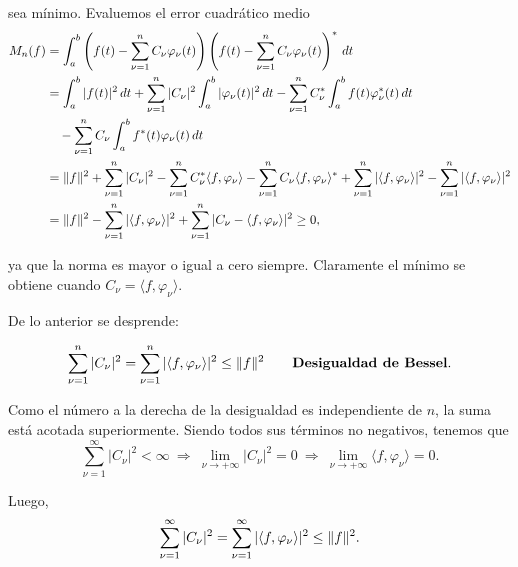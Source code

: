 sea mínimo. Evaluemos el error cuadrático medio
\begin{align}
    M_n(f) &= \int_a^b \left( f(t) - \sum_{\nu = 1}^n C_{\nu} \varphi_{\nu}(t)  \right) \left( f(t) - \sum_{\nu = 1}^n C_{\nu} \varphi_{\nu}(t) \right)^* \,dt \nonumber \\
    &= \int_a^b |f(t)|^2 \, dt  + \sum_{\nu = 1}^n |C_{\nu}|^2 \int_a^b |\varphi_{\nu}(t)|^2 \,dt - \sum_{\nu = 1}^n C_{\nu}^* \int_a^b f(t) \varphi_{\nu}^*(t) \,dt \nonumber \\
    & \quad - \sum_{\nu = 1}^n C_{\nu} \int_a^b f^*(t) \varphi_{\nu}(t) \,dt  \nonumber \\
    &= \lVert f\rVert^2 + \sum_{\nu = 1}^n |C_{\nu}|^2 - \sum_{\nu = 1}^n C_{\nu}^* \langle f, \varphi_{\nu} \rangle - \sum_{\nu = 1}^n C_{\nu} \langle f, \varphi_{\nu} \rangle^* + \sum_{\nu = 1}^n |\langle f, \varphi_{\nu} \rangle|^2 - \sum_{\nu = 1}^n |\langle f, \varphi_{\nu} \rangle|^2\nonumber  \\
    &= \lVert f\rVert^2  - \sum_{\nu = 1}^n |\langle f, \varphi_{\nu} \rangle|^2 + \sum_{\nu = 1}^n |C_{\nu} - \langle f , \varphi_{\nu} \rangle|^2 \geq 0, \label{ErrorMedio}
\end{align}

ya que la norma es mayor o igual a cero siempre. Claramente el mínimo se obtiene cuando $C_{\nu} = \langle f, \varphi_{\nu} \rangle$. 

De lo anterior se desprende: 
\begin{shaded}
 \begin{equation}
 \sum_{\nu = 1}^n |C_{\nu}|^2 = \sum_{\nu = 1}^n |\langle f , \varphi_{\nu} \rangle|^2 \leq \lVert f\rVert^2  \qquad \mbox{\textbf{Desigualdad de Bessel}} \label{D.Bessel}.
\end{equation}
 
\end{shaded}

Como el número a la derecha de la desigualdad es independiente de $n$, la suma está acotada superiormente. Siendo todos sus términos no negativos, tenemos que
$$\sum_{\nu = 1}^{\infty} |C_{\nu}|^2 < \infty ~\Rightarrow~ \lim_{\nu \to + \infty} |C_{\nu}|^2 = 0 ~\Rightarrow ~ \lim_{\nu \to + \infty} \langle f , \varphi_{\nu} \rangle = 0.$$

Luego,
\begin{equation*}
 \sum_{\nu = 1}^{\infty} |C_{\nu}|^2 = \sum_{\nu = 1}^{\infty} |\langle f , \varphi_{\nu} \rangle|^2 \leq \lVert f\rVert^2    .
\end{equation*}

